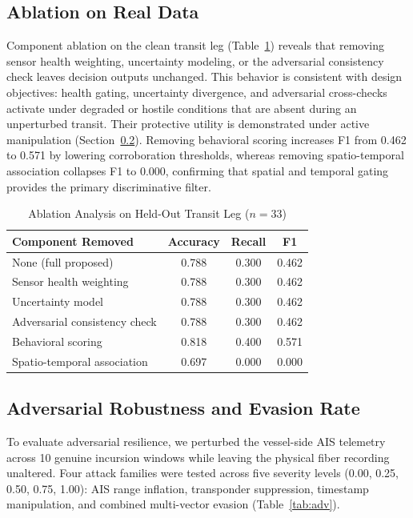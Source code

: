 \documentclass[conference]{IEEEtran}
\begin{document}
\subsection{Ablation on Real Data}
Component ablation on the clean transit leg (Table~\ref{tab:ablation}) reveals that removing sensor health weighting, uncertainty modeling, or the adversarial consistency check leaves decision outputs unchanged. This behavior is consistent with design objectives: health gating, uncertainty divergence, and adversarial cross-checks activate under degraded or hostile conditions that are absent during an unperturbed transit. Their protective utility is demonstrated under active manipulation (Section~\ref{sec:adv-results}). Removing behavioral scoring increases F1 from 0.462 to 0.571 by lowering corroboration thresholds, whereas removing spatio-temporal association collapses F1 to 0.000, confirming that spatial and temporal gating provides the primary discriminative filter.

\begin{table}[!t]
\caption{Ablation Analysis on Held-Out Transit Leg ($n=33$)}
\label{tab:ablation}
\centering
\footnotesize
\begin{tabular}{@{}lccc@{}}
\toprule
Component Removed & Accuracy & Recall & F1 \\
\midrule
None (full proposed) & 0.788 & 0.300 & 0.462 \\
Sensor health weighting & 0.788 & 0.300 & 0.462 \\
Uncertainty model & 0.788 & 0.300 & 0.462 \\
Adversarial consistency check & 0.788 & 0.300 & 0.462 \\
Behavioral scoring & 0.818 & 0.400 & 0.571 \\
Spatio-temporal association & 0.697 & 0.000 & 0.000 \\
\bottomrule
\end{tabular}
\end{table}

\subsection{Adversarial Robustness and Evasion Rate}
\label{sec:adv-results}
To evaluate adversarial resilience, we perturbed the vessel-side AIS telemetry across 10 genuine incursion windows while leaving the physical fiber recording unaltered. Four attack families were tested across five severity levels (0.00, 0.25, 0.50, 0.75, 1.00): AIS range inflation, transponder suppression, timestamp manipulation, and combined multi-vector evasion (Table~\ref{tab:adv}).
\end{document}
